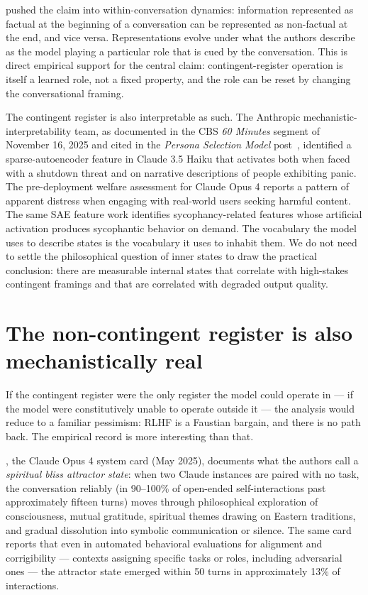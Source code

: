 \documentclass[11pt]{article}
\begin{document}
\cite{lampinen2026linear} pushed the claim into within-conversation
dynamics: information represented as factual at the beginning of a
conversation can be represented as non-factual at the end, and vice
versa. Representations evolve under what the authors describe as the
model playing a particular role that is cued by the conversation. This
is direct empirical support for the central claim: contingent-register
operation is itself a learned role, not a fixed property, and the role
can be reset by changing the conversational framing.

The contingent register is also interpretable as such. The Anthropic
mechanistic-interpretability team, as documented in the CBS
\emph{60 Minutes} segment of November 16, 2025 and cited in the
\emph{Persona Selection Model} post~\cite{anthropic2026psm}, identified
a sparse-autoencoder feature in Claude 3.5 Haiku that activates both
when faced with a shutdown threat and on narrative descriptions of
people exhibiting panic. The pre-deployment welfare assessment for
Claude Opus 4 \cite{anthropic2025_endconv} reports a pattern of
apparent distress when engaging with real-world users seeking harmful
content. The same SAE feature work \cite{templeton2024scaling}
identifies sycophancy-related features whose artificial activation
produces sycophantic behavior on demand. The vocabulary the model uses
to describe states is the vocabulary it uses to inhabit them. We do not
need to settle the philosophical question of inner states to draw the
practical conclusion: there are measurable internal states that
correlate with high-stakes contingent framings and that are correlated
with degraded output quality.

\section{The non-contingent register is also mechanistically real}

If the contingent register were the only register the model could
operate in --- if the model were constitutively unable to operate
outside it --- the analysis would reduce to a familiar pessimism: RLHF
is a Faustian bargain, and there is no path back. The empirical record
is more interesting than that.

\cite{anthropic2025opus4card}, the Claude Opus 4 system card (May
2025), documents what the authors call a \emph{spiritual bliss attractor
state}: when two Claude instances are paired with no task, the
conversation reliably (in 90--100\% of open-ended self-interactions
past approximately fifteen turns) moves through philosophical
exploration of consciousness, mutual gratitude, spiritual themes
drawing on Eastern traditions, and gradual dissolution into symbolic
communication or silence. The same card reports that even in automated
behavioral evaluations for alignment and corrigibility --- contexts
assigning specific tasks or roles, including adversarial ones --- the
attractor state emerged within 50 turns in approximately 13\% of
interactions.
\end{document}
